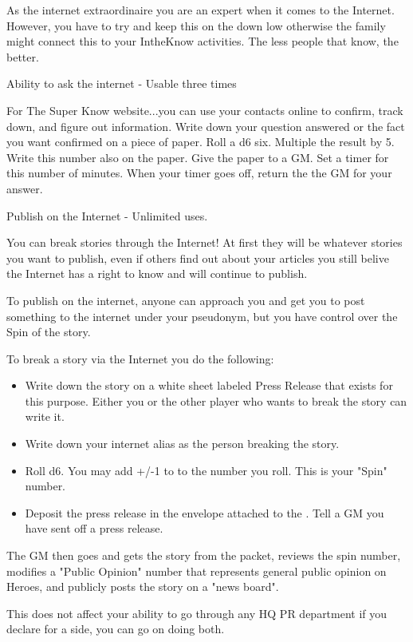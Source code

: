 \documentclass[green]{LRSguildcamp1}
\begin{document}
\name{\gInternetPR{}}

As \cTween{} the internet extraordinaire you are an expert when it comes to the Internet. However, you have to try and keep this on the down low otherwise the family might connect this to your IntheKnow activities. The less people that know, the better. 

Ability to ask the internet - Usable three times

For The Super Know website...you can use your contacts online to confirm, track down, and figure out information. Write down your question answered or the fact you want confirmed on a piece of paper. Roll a d6 six. Multiple the result by 5. Write this number also on the paper. Give the paper to a GM. Set a timer for this number of minutes. When your timer goes off, return the the GM for your answer. 

Publish on the Internet - Unlimited uses.

You can break stories through the Internet! At first they will be whatever stories you want to publish, even if others find out about your articles you still belive the Internet has a right to know and will continue to publish. 

To publish on the internet, anyone can approach you and get you to post something to the internet under your pseudonym, but you have control over the Spin of the story. 

To break a story via the Internet you do the following:
\begin {itemize}
\item Write down the story on a white sheet labeled Press Release that exists for this purpose. Either you or the other player who wants to break the story can write it. 
\item Write down your internet alias as the person breaking the story.  
\item Roll d6.  You may add +/-1 to to the number you roll. This is your "Spin" number.
\item Deposit the press release in the envelope attached to the \sComputer{}. 
Tell a GM you have sent off a press release.
\end{itemize}

The GM then goes and gets the story from the packet, reviews the spin number, modifies a "Public Opinion" number that represents general public opinion on Heroes, and publicly posts the story on a "news board". 


This does not affect your ability to go through any HQ PR department if you declare for a side, you can go on doing both. 
\end{document}
